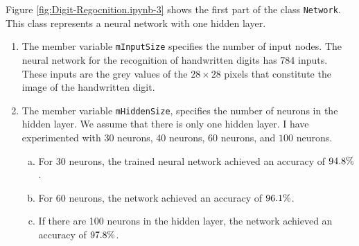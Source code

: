Figure \ref{fig:Digit-Regocnition.ipynb-3} shows the first part of the class \texttt{Network}.  This class
represents a neural network with one hidden layer. 
\begin{enumerate}
\item The member variable \texttt{mInputSize} specifies the number of input nodes.  The neural network for the
      recognition of handwritten digits has 784 inputs.  These inputs are the grey values of the $28 \times 28$
      pixels that constitute the image of the handwritten digit.
\item The member variable \texttt{mHiddenSize}, specifies the number of neurons in the hidden layer.  We assume that
      there is only one hidden layer.  I have experimented with 30 neurons, 40 neurons, 60 neurons, and $100$ neurons.
      \begin{enumerate}[(a)]
      \item For 30 neurons, the trained neural network achieved an
            accuracy of $94.8\symbol{37}$.
      \item For 60 neurons, the network achieved an accuracy of $96.1\symbol{37}$.
      \item If there are 100 neurons in the hidden layer, the network achieved an accuracy of $97.8\symbol{37}$.


\end{enumerate}
\end{enumerate}
